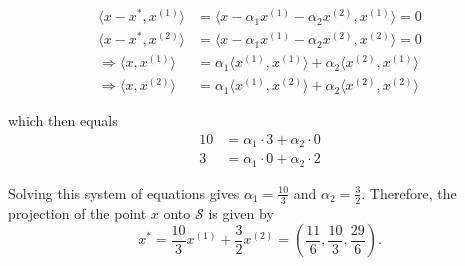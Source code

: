 \begin{homeworkProblem}
\begin{solution}
    \[
        \begin{split}
            \langle x - x^*, x^{(1)} \rangle &= \langle x - \alpha_1 x^{(1)} - \alpha_2 x^{(2)}, x^{(1)} \rangle = 0 \\
            \langle x - x^*, x^{(2)} \rangle &= \langle x - \alpha_1 x^{(1)} - \alpha_2 x^{(2)}, x^{(2)} \rangle = 0 \\
            \Rightarrow \langle x, x^{(1)} \rangle &= \alpha_1 \langle x^{(1)}, x^{(1)} \rangle + \alpha_2 \langle x^{(2)}, x^{(1)} \rangle \\
            \Rightarrow \langle x, x^{(2)} \rangle &= \alpha_1 \langle x^{(1)}, x^{(2)} \rangle + \alpha_2 \langle x^{(2)}, x^{(2)} \rangle
        \end{split}
    \]

    which then equals
    \[
        \begin{split}
            10 &= \alpha_1 \cdot 3 + \alpha_2 \cdot 0 \\
            3 &= \alpha_1 \cdot 0 + \alpha_2 \cdot 2
        \end{split}
    \]

    Solving this system of equations gives $\alpha_1 = \frac{10}{3}$ and $\alpha_2 = \frac{3}{2}$. 
    Therefore, the projection of the point $x$ onto $\mathcal S$ is given by 
    $$x^* = \frac{10}{3} x^{(1)} + \frac{3}{2} x^{(2)} = \left(\frac{11}{6}, \frac{10}{3}, \frac{29}{6}\right).$$
    

\end{solution}

\end{homeworkProblem}

